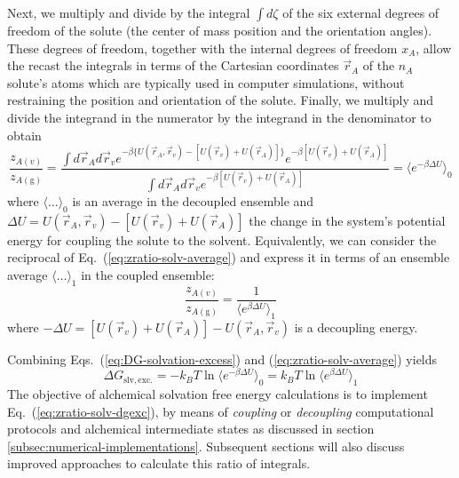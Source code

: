 \documentclass[9pt,bestpractices]{livecoms}
\begin{document}
Next, we multiply and divide by the integral $\int d\zeta$ of the six external degrees of freedom of the solute (the center of mass position and the orientation angles). These degrees of freedom, together with the internal degrees of freedom $x_A$, allow the recast the integrals in terms of the Cartesian coordinates $\vec{r}_A$ of the $n_A$ solute's atoms which are typically used in computer simulations, without restraining the position and orientation of the solute. Finally, we multiply and divide the integrand in the numerator by the integrand in the denominator to obtain
\begin{equation}
  \frac{z_{A(v)}}{z_{A(\mathrm{g})}} =
  \frac{
    \int d\vec{r}_A  d\vec{r}_v  e^{-\beta \{ U(\vec{r}_A, \vec{r}_v) -  [ U(\vec{r}_v) + U(\vec{r}_A) ] \}} e^{-\beta [U(\vec{r}_v) + U(  \vec{r}_A  )] } 
  }{
    \int d\vec{r}_A d\vec{r}_v e^{-\beta [U(\vec{r}_v) + U( \vec{r}_A  )] } 
  } = \langle e^{-\beta \Delta U} \rangle_0
  \label{eq:zratio-solv-average}
\end{equation}
where $\langle \ldots \rangle_0$ is an average in the decoupled ensemble and $\Delta U =  U(\vec{r}_A , \vec{r}_v) -  [ U(\vec{r}_v) + U(\vec{r}_A ) ]$ the change in the system's potential energy for coupling the solute to the solvent. Equivalently, we can consider the reciprocal of Eq.~(\ref{eq:zratio-solv-average}) and express it in terms of an ensemble average $\langle \ldots \rangle_1$ in the coupled ensemble:
\begin{equation}
  \frac{z_{A(v)}}{z_{A(\mathrm{g})}} = \frac{1}{\langle e^{\beta \Delta U} \rangle_1}
\end{equation}
where $-\Delta U = [ U(\vec{r}_v) + U(\vec{r}_A ) ] - U(\vec{r}_A , \vec{r}_v)$ is a decoupling energy.

Combining Eqs.~(\ref{eq:DG-solvation-excess}) and (\ref{eq:zratio-solv-average}) yields\cite{widom1982potential} 
\begin{equation}
  \Delta G_{\mathrm{slv, exc.}} = - k_B T \ln \langle e^{-\beta \Delta U} \rangle_0 = k_B T \ln \langle e^{\beta \Delta U} \rangle_1
  \label{eq:zratio-solv-dgexc}
\end{equation}
The objective of alchemical solvation free energy calculations is to implement Eq.~(\ref{eq:zratio-solv-dgexc}), by means of \emph{coupling} or \emph{decoupling} computational protocols and alchemical intermediate states as  discussed in section \ref{subsec:numerical-implementations}.  Subsequent sections will also discuss improved approaches to calculate this ratio of integrals.
\end{document}

